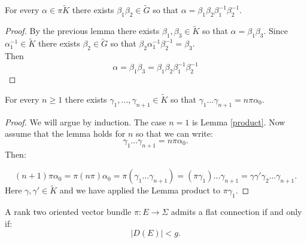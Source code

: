 \begin{lemma}\label{lema_3}
	For every $\alpha \in \pi \tilde{K}$ there exists $\beta_1 \beta_{2} \in \tilde{G}$ so that $\alpha=\beta_{1}\beta_{2}\beta_{1}^{-1}\beta_{2}^{-1}$.
\end{lemma}
\begin{proof}
	By the previous lemma there exists $\beta_{1},\beta_{3} \in \tilde{K}$ so that $\alpha=\beta_{1}\beta_{3}$. Since $\alpha_{1} ^{-1} \in \tilde{K}$ there exists $\beta_{2} \in \tilde{G}$ so that $\beta_{2} \alpha_{1}^{-1} \beta_{2}^{-1}=\beta_{3}$.\\
	Then $$\alpha=\beta_{1} \beta_{3}=\beta_{1} \beta_{2} \beta_{1}^{-1}\beta_{2}^{-1}$$
\end{proof}
\begin{lemma}\label{list}
	For every $n \geq1 $ there exists $\gamma_1,\dots, \gamma_{n+1} \in \tilde{K}$ so that $\gamma_1 \dots \gamma_{n+1}=n \pi\alpha_{0}.$
\end{lemma}
\begin{proof}
	We will argue by induction. The case $n=1$ is Lemma \ref{product}. Now assume that the lemma holds for $n$ so that we can write:
	\[\gamma_1 \dots \gamma_{n+1}=n \pi\alpha_{0}.\] Then:
	
	\[ (n+1)\pi \alpha_0= \pi (n \pi) \alpha_0=\pi (\gamma_1 \dots \gamma_{n+1})=(\pi \gamma_1) \dots \gamma_{n+1}=\gamma \gamma' \gamma_2 \dots \gamma_{n+1}.\]
	Here $\gamma, \gamma' \in \tilde{K}$ and we have applied the Lemma product to $\pi \gamma_1$.
	
\end{proof}





\begin{theorem}\label{Milnor}
	A rank two oriented vector bundle $\pi:E \rightarrow \Sigma$ admits a flat connection if and only if:
	\[ |D(E)|<g.\]
\end{theorem}

